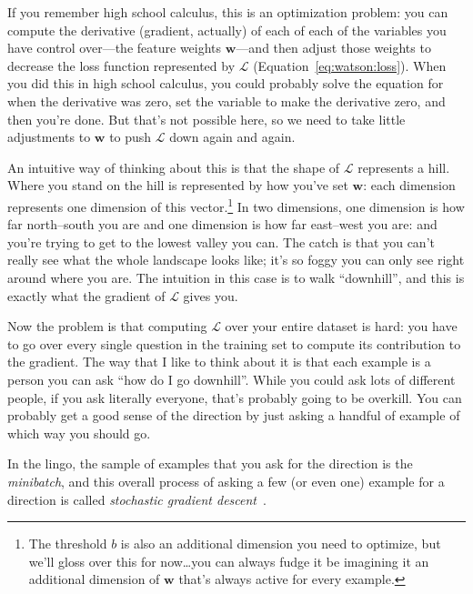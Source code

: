 If you remember high school calculus, this is an optimization problem: you can
compute the derivative (gradient, actually) of each of each of the variables
you have control over---the feature weights ${\bm w}$---and then adjust those
weights to decrease the loss function represented by $\mathcal{L}$
(Equation~\ref{eq:watson:loss}).
%
When you did this in high school calculus, you could probably solve the
equation for when the derivative was zero, set the variable to make the
derivative zero, and then you're done.
%
But that's not possible here, so we need to take little adjustments to ${\bm
  w}$ to push $\mathcal{L}$ down again and again.

An intuitive way of thinking about this is that the shape of $\mathcal{L}$
represents a hill.
%
Where you stand on the hill is represented by how you've set ${\bm w}$: each
dimension represents one dimension of this vector.\footnote{The threshold $b$
  is also an additional dimension you need to optimize, but we'll gloss over
  this for now\dots you can always fudge it be imagining it an additional
  dimension of ${\bm w}$ that's always active for every example.}
%
In two dimensions, one dimension is how far north--south you are and one
dimension is how far east--west you are: and you're trying to get to the
lowest valley you can.
%
The catch is that you can't really see what the whole landscape looks like;
it's so foggy you can only see right around where you are.
%
The intuition in this case is to walk ``downhill'', and this is exactly what
the gradient of $\mathcal{L}$ gives you.

Now the problem is that computing $\mathcal{L}$ over your entire dataset is
hard: you have to go over every single question in the \jeopardy{} training
set to compute its contribution to the gradient.
%
The way that I like to think about it is that each example is a person you can
ask ``how do I go downhill''.
%
While you could ask lots of different people, if you ask literally everyone,
that's probably going to be overkill.
%
You can probably get a good sense of the direction by just asking a handful of
example of which way you should go.

In the lingo, the sample of examples that you ask for the direction is the
\emph{minibatch}, and this overall process of asking a few (or even one)
example for a direction is called \emph{stochastic gradient descent}~\citep{bottou-04}.

